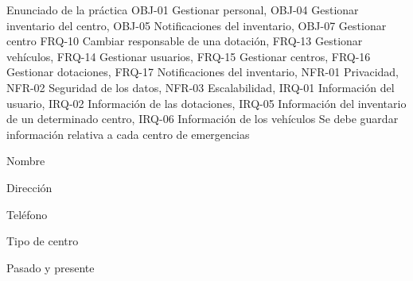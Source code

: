 {\reportauthors}
{Enunciado de la práctica}
{OBJ-01 Gestionar personal, OBJ-04 Gestionar inventario del centro, OBJ-05 Notificaciones del inventario, OBJ-07 Gestionar centro}
{FRQ-10 Cambiar responsable de una dotación, FRQ-13 Gestionar vehículos, FRQ-14 Gestionar usuarios, FRQ-15 Gestionar centros, FRQ-16 Gestionar dotaciones, FRQ-17 Notificaciones del inventario, NFR-01 Privacidad, NFR-02 Seguridad de los datos, NFR-03 Escalabilidad, IRQ-01 Información del usuario, IRQ-02 Información de las dotaciones, IRQ-05 Información del inventario de un determinado centro, IRQ-06 Información de los vehículos}
{Se debe guardar información relativa a cada centro de emergencias}
{
\item{Nombre}
\item{Dirección}
\item{Teléfono}
\item{Tipo de centro}
}
{Pasado y presente}

